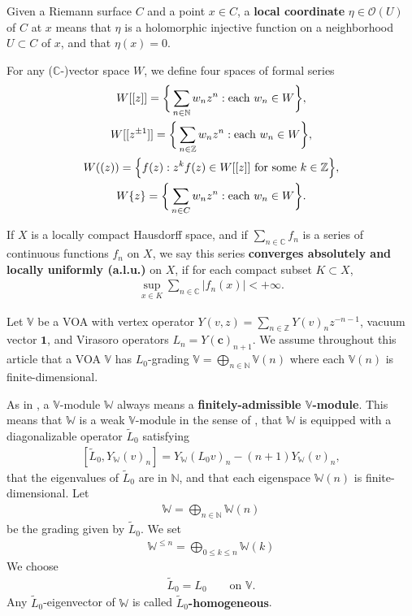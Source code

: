 \documentclass[11pt,b5paper,notitlepage]{article}
\theoremstyle{definition}
\theoremstyle{plain}
\newcommand{\wtd}{\widetilde}
\newcommand{\id}{\mathbf{1}}
\newcommand{\scr}{\mathscr}
\newcommand{\mbb}{\mathbb}
\newcommand{\Vbb}{\mathbb V}
\newcommand{\Wbb}{\mathbb W}
\newcommand{\Cbb}{\mathbb C}
\newcommand{\Nbb}{\mathbb N}
\newcommand{\Zbb}{\mathbb Z}
\newcommand{\cbf}{\mathbf c}
\numberwithin{equation}{subsection}
\begin{document}
Given a Riemann surface $C$ and a point $x\in C$, a \textbf{local coordinate} $\eta\in\scr O(U)$ of $C$ at $x$ means that $\eta$ is a holomorphic injective function on a neighborhood $U\subset C$ of $x$, and that $\eta(x)=0$.


For any ($\Cbb$-)vector space $W$, we define four spaces of formal series 
\begin{gather*}
W[[z]]=\bigg\{\sum_{n\in\mathbb N}w_nz^n:\text{each }w_n\in W\bigg\},\\
W[[z^{\pm 1}]]=\bigg\{\sum_{n\in\mathbb Z}w_nz^n:\text{each }w_n\in W\bigg\},\\
W((z))=\Big\{f(z):z^kf(z)\in W[[z]]\text{ for some }k\in\mbb Z \Big\},\\
W\{z\}=\bigg\{\sum_{n\in\mathbb \Cbb}w_nz^n:\text{each }w_n\in W\bigg\}.
\end{gather*}


If $X$ is a locally compact Hausdorff space, and if $\sum_{n\in\Cbb} f_n$ is a series of continuous functions $f_n$ on $X$, we say this series \textbf{converges absolutely and locally uniformly (a.l.u.)} on $X$, if for each compact subset $K\subset X$,
\begin{align}\label{eq10}
\sup_{x\in K}\sum_{n\in\Cbb}|f_n(x)|<+\infty.	
\end{align} 



Let $\Vbb$ be a  VOA with vertex operator $Y(v,z)=\sum_{n\in\Zbb}Y(v)_nz^{-n-1}$, vacuum vector $\id$, and Virasoro operators $L_n=Y(\cbf)_{n+1}$. We assume throughout this article that a VOA $\Vbb$ has $L_0$-grading $\Vbb=\bigoplus_{n\in\Nbb}\Vbb(n)$ where each $\Vbb(n)$ is finite-dimensional.


As in \cite{Gui24b},  a $\Vbb$-module $\Wbb$ always means a \textbf{finitely-admissible $\Vbb$-module}. This means that $\Wbb$ is a weak $\Vbb$-module in the sense of \cite{DLM97}, that $\Wbb$ is equipped with a diagonalizable operator $\wtd L_0$ satisfying \index{L0@$\wtd L_0$}  
\begin{align}\label{eq34}
	[\wtd L_0,Y_\Wbb(v)_n]=Y_\Wbb(L_0 v)_n-(n+1)Y_\Wbb(v)_n,	
\end{align}
that the eigenvalues of $\wtd L_0$ are in $\Nbb$, and that each eigenspace $\Wbb(n)$ is finite-dimensional. Let \index{W@$\Wbb(n),\Wbb_{(n)}$}
\begin{align*}
	\Wbb=\bigoplus_{n\in\Nbb}\Wbb(n)	
\end{align*}
be the grading given by $\wtd L_0$. We set
\begin{align*}
	\Wbb^{\leq n}=\bigoplus_{0\leq k\leq n}	\Wbb{(k)}
\end{align*}
We choose  
\begin{align*}
\wtd L_0=L_0\qquad\text{on }\Vbb.	
\end{align*}
Any $\wtd L_0$-eigenvector of $\Wbb$  is called \textbf{$\wtd L_0$-homogeneous}.
\end{document}
